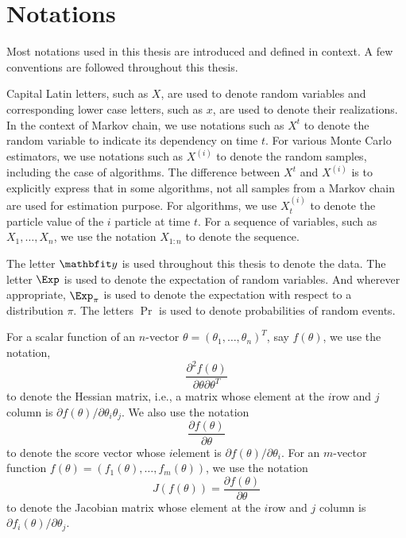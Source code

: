 \section{Notations}
\label{sec:Notations}

Most notations used in this thesis are introduced and defined in context. A
few conventions are followed throughout this thesis.

Capital Latin letters, such as $X$, are used to denote random variables and
corresponding lower case letters, such as $x$, are used to denote their
realizations. In the context of Markov chain, we use notations such as $X^t$
to denote the random variable to indicate its dependency on time $t$. For
various Monte Carlo estimators, we use notations such as $X^{(i)}$ to denote
the random samples, including the case of \mcmc algorithms. The difference
between $X^t$ and $X^{(i)}$ is to explicitly express that in some algorithms,
not all samples from a Markov chain are used for estimation purpose. For \smc
algorithms, we use $X_t^{(i)}$ to denote the particle value of the $i$\xth
particle at time $t$. For a sequence of variables, such as $X_1,\dots,X_n$,
we use the notation $X_{1:n}$ to denote the sequence.

The letter $\data$ is used throughout this thesis to denote the data. The
letter $\Exp$ is used to denote the expectation of random variables. And
wherever appropriate, $\Exp_{\pi}$ is used to denote the expectation with
respect to a distribution $\pi$. The letters $\Pr$ is used to denote
probabilities of random events.

For a scalar function of an $n$-vector $\theta = (\theta_1,\dots,\theta_n)^T$,
say $f(\theta)$, we use the notation,
\begin{equation*}
  \frac{\partial^2 f(\theta)}{\partial\theta\partial\theta^T}
\end{equation*}
to denote the Hessian matrix, i.e., a matrix whose element at the $i$\xth row
and $j$\xth column is $\partial f(\theta)/\partial\theta_i\theta_j$. We also
use the notation
\begin{equation*}
  \frac{\partial f(\theta)}{\partial\theta}
\end{equation*}
to denote the score vector whose $i$\xth element is $\partial
f(\theta)/\partial\theta_i$. For an $m$-vector function $f(\theta) =
(f_1(\theta),\dots,f_m(\theta))$, we use the notation
\begin{equation*}
  J(f(\theta)) = \frac{\partial f(\theta)}{\partial\theta}
\end{equation*}
to denote the Jacobian matrix whose element at the $i$\xth row and $j$\xth
column is $\partial f_i(\theta)/\partial\theta_j$.

